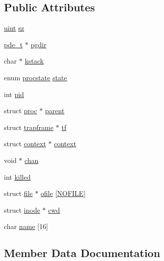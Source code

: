 \subsection*{Public Attributes}
\begin{DoxyCompactItemize}
\item 
\hyperlink{types_8h_a91ad9478d81a7aaf2593e8d9c3d06a14}{uint} \hyperlink{structproc_a6e67042bb361124ff287af88efc33e00}{sz}
\item 
\hyperlink{types_8h_ac131849542282b2c95dfeaf1f26dc010}{pde\+\_\+t} $\ast$ \hyperlink{structproc_ad430afc653e9eb6cee33954d5545b79d}{pgdir}
\item 
char $\ast$ \hyperlink{structproc_a9f556df98482bff6c9216013d7581ae4}{kstack}
\item 
enum \hyperlink{proc_8h_aa1ced7d2b60040fded3fa873d0c03ba7}{procstate} \hyperlink{structproc_a0f2fe91548a1382672ae26e29ca9e736}{state}
\item 
int \hyperlink{structproc_acf2bdf54d1f957ccbcdc987007029944}{pid}
\item 
struct \hyperlink{structproc}{proc} $\ast$ \hyperlink{structproc_a14ea8849701ffafba4d142725de154d4}{parent}
\item 
struct \hyperlink{structtrapframe}{trapframe} $\ast$ \hyperlink{structproc_a56ec07ac1e10ce42adfc8dd2a366071f}{tf}
\item 
struct \hyperlink{structcontext}{context} $\ast$ \hyperlink{structproc_ae0d9bffe1ad1c7d60dd2733be0a2333c}{context}
\item 
void $\ast$ \hyperlink{structproc_a03048a49756c2243576208ba4ec5fbd4}{chan}
\item 
int \hyperlink{structproc_afb4f94a3f4df9a835dbb41b0c26660a4}{killed}
\item 
struct \hyperlink{structfile}{file} $\ast$ \hyperlink{structproc_a4a9eb0352efe3fc097c91fccfaac50bd}{ofile} \mbox{[}\hyperlink{param_8h_a80bacbaea8dd6aecf216d85d981bcb21}{N\+O\+F\+I\+LE}\mbox{]}
\item 
struct \hyperlink{structinode}{inode} $\ast$ \hyperlink{structproc_a493bc338ce008a838eef521972a35257}{cwd}
\item 
char \hyperlink{structproc_ac04af53e17d24b90c3cbfab56d658d62}{name} \mbox{[}16\mbox{]}
\end{DoxyCompactItemize}


\subsection{Member Data Documentation}
